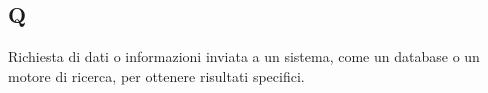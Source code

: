 \begin{center}
\section*{Q}
\end{center}

Richiesta di dati o informazioni inviata a un sistema, come un database o un motore di ricerca, per ottenere risultati specifici.


